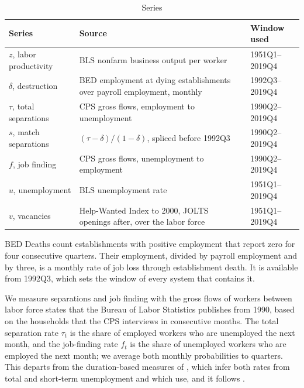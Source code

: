 \documentclass[authoryear, review, 12pt]{elsarticle}
\begin{document}
\begin{table}[H]
\centering
\caption{Series}\label{tab:data}
\small
\begin{tabular}{p{3.6cm}p{8.2cm}p{3.0cm}}
\toprule
Series & Source & Window used \\
\midrule
$z$, labor productivity & BLS nonfarm business output per worker & 1951Q1--2019Q4 \\
$\delta$, destruction & BED employment at dying establishments over payroll employment, monthly & 1992Q3--2019Q4 \\
$\tau$, total separations & CPS gross flows, employment to unemployment & 1990Q2--2019Q4 \\
$s$, match separations & $(\tau-\delta)/(1-\delta)$, spliced before 1992Q3 & 1990Q2--2019Q4 \\
$f$, job finding & CPS gross flows, unemployment to employment & 1990Q2--2019Q4 \\
$u$, unemployment & BLS unemployment rate & 1951Q1--2019Q4 \\
$v$, vacancies & Help-Wanted Index to 2000, JOLTS openings after, over the labor force & 1951Q1--2019Q4 \\
\bottomrule
\end{tabular}
\end{table}

 BED Deaths count establishments with positive employment that report zero for four consecutive quarters. Their employment, divided by payroll employment and by three, is a monthly rate of job loss through establishment death. It is available from 1992Q3, which sets the window of every system that contains it.

 We measure separations and job finding with the gross flows of workers between labor force states that the Bureau of Labor Statistics publishes from 1990, based on the households that the CPS interviews in consecutive months. The total separation rate $\tau_t$ is the share of employed workers who are unemployed the next month, and the job-finding rate $f_t$ is the share of unemployed workers who are employed the next month; we average both monthly probabilities to quarters. This departs from the duration-based measures of \citet{shimer_2005, shimer_2012}, which infer both rates from total and short-term unemployment and which \citet{coles_2018} use, and it follows \citet{fujita_2009}.
\end{document}
